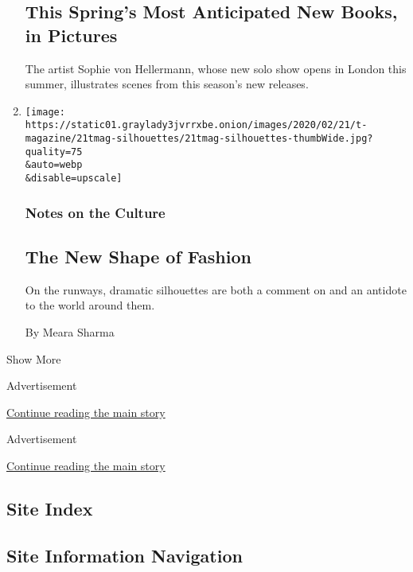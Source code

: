 \begin{enumerate}
  \hypertarget{this-springs-most-anticipated-new-books-in-pictures}{%
  \subsection{This Spring's Most Anticipated New Books, in
  Pictures}\label{this-springs-most-anticipated-new-books-in-pictures}}

  The artist Sophie von Hellermann, whose new solo show opens in London
  this summer, illustrates scenes from this season's new releases.
\item
  \href{/2020/02/20/t-magazine/fashion-silhouettes.html}{}

  \texttt{[image: https://static01.graylady3jvrrxbe.onion/images/2020/02/21/t-magazine/21tmag-silhouettes/21tmag-silhouettes-thumbWide.jpg?quality=75\\\&auto=webp\\\&disable=upscale]}

  \hypertarget{notes-on-the-culture-1}{%
  \subsubsection{Notes on the Culture}\label{notes-on-the-culture-1}}

  \hypertarget{the-new-shape-of-fashion}{%
  \subsection{The New Shape of Fashion}\label{the-new-shape-of-fashion}}

  On the runways, dramatic silhouettes are both a comment on and an
  antidote to the world around them.

  By Meara Sharma
\end{enumerate}

Show More

Advertisement

\protect\hyperlink{after-mid2}{Continue reading the main story}

Advertisement

\protect\hyperlink{after-mktg}{Continue reading the main story}

\hypertarget{site-index}{%
\subsection{Site Index}\label{site-index}}

\hypertarget{site-information-navigation}{%
\subsection{Site Information
Navigation}\label{site-information-navigation}}

